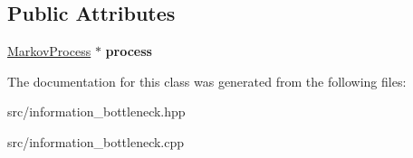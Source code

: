 \subsection*{Public Attributes}
\begin{DoxyCompactItemize}
\item 
\hypertarget{classInformationBottleneck_a0d288b82a5d34dff1210d54383ce5997}{\hyperlink{classMarkovProcess}{Markov\-Process} $\ast$ {\bfseries process}}\label{classInformationBottleneck_a0d288b82a5d34dff1210d54383ce5997}

\end{DoxyCompactItemize}


The documentation for this class was generated from the following files\-:\begin{DoxyCompactItemize}
\item 
src/information\-\_\-bottleneck.\-hpp\item 
src/information\-\_\-bottleneck.\-cpp\end{DoxyCompactItemize}
